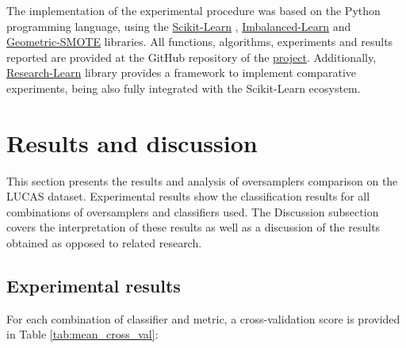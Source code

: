 \documentclass[remotesensing,article,submit,moreauthors,pdftex]{Definitions/mdpi}
\begin{document}
The implementation of the experimental procedure was based on the Python
programming language, using the
\href{https://scikit-learn.org/stable/}{Scikit-Learn} \cite{Pedregosa2011},
\href{https://imbalanced-learn.org/en/stable/}{Imbalanced-Learn} \cite{JMLR:v18:16-365}
and
\href{https://geometric-smote.readthedocs.io/en/latest/?badge=latest}{Geometric-SMOTE}
libraries. All functions, algorithms, experiments and results reported are
provided at the GitHub repository of the
\href{https://github.com/AlgoWit/publications/tree/master/remote-sensing-lucas}{project}.
Additionally,
\href{https://research-learn.readthedocs.io/en/latest/?badge=latest}{Research-Learn}
library provides a framework to implement comparative experiments, being also
fully integrated with the Scikit-Learn ecosystem.

\section{Results and discussion}

This section presents the results and analysis of oversamplers comparison on the
LUCAS dataset. Experimental results show the classification results for all
combinations of oversamplers and classifiers used. The Discussion subsection
covers the interpretation of these results as well as a discussion of the
results obtained as opposed to related research.


\subsection{Experimental results}

For each combination of classifier and metric, a cross-validation score is
provided in Table \ref{tab:mean_cross_val}:

\end{document}
